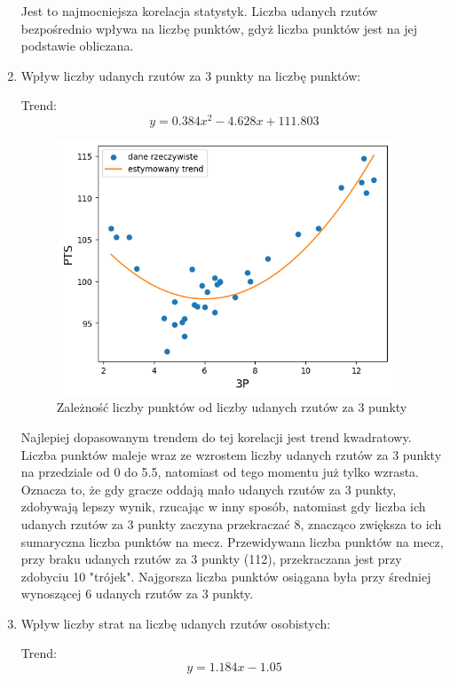 \documentclass{article}
\begin{document}
\begin{enumerate}
        Jest to najmocniejsza korelacja statystyk. Liczba udanych rzutów bezpośrednio wpływa na liczbę punktów, gdyż liczba punktów jest na jej podstawie obliczana.
\newpage 
        \item Wpływ liczby udanych rzutów za 3 punkty na liczbę punktów:
        
        
        Trend:\begin{equation} y = 0.384x^{2} - 4.628x + 111.803 \end{equation}
        
            \begin{figure}[H]
                \centering
                \includegraphics[width=10cm]{wykres_zaleznosci_PTS_od_3P.png}
                \caption{Zależność liczby punktów od liczby udanych rzutów za 3 punkty}
                \label{fig:wykres_zaleznosci_PTS_od_3P}
            \end{figure}

        Najlepiej dopasowanym trendem do tej korelacji jest trend kwadratowy. Liczba punktów maleje wraz ze wzrostem liczby udanych rzutów za 3 punkty na przedziale od 0 do 5.5, natomiast od tego momentu już tylko wzrasta. Oznacza to, że gdy gracze oddają mało udanych rzutów za 3 punkty, zdobywają lepszy wynik, rzucając w inny sposób, natomiast gdy liczba ich udanych rzutów za 3 punkty zaczyna przekraczać 8, znacząco zwiększa to ich sumaryczna liczba punktów na mecz. Przewidywana liczba punktów na mecz, przy braku udanych rzutów za 3 punkty (112), przekraczana jest przy zdobyciu 10 "trójek". Najgorsza liczba punktów osiągana była przy średniej wynoszącej 6 udanych rzutów za 3 punkty.    
\newpage 
        \item Wpływ liczby strat na liczbę udanych rzutów osobistych:
        
        
        Trend:\begin{equation} y = 1.184x - 1.05 \end{equation}
        

\end{enumerate}
\end{document}
